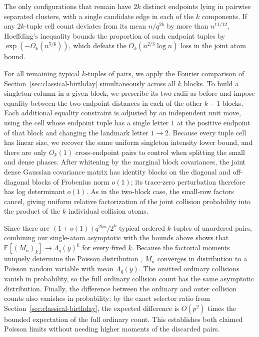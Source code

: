 The only configurations that remain have \(2k\) distinct endpoints lying in pairwise separated clusters, with a single candidate edge in each of the \(k\) components. If any \(2k\)-tuple cell count deviates from its mean \(n/q^{2k}\) by more than \(n^{11/12}\), Hoeffding's inequality bounds the proportion of such endpoint tuples by \(\exp(-\Omega_k(n^{5/6}))\), which defeats the \(O_k(n^{2/3}\log n)\) loss in the joint atom bound.

For all remaining typical \(k\)-tuples of pairs, we apply the Fourier comparison of Section~\ref{sec:classical-birthday} simultaneously across all \(k\) blocks. To build a singleton column in a given block, we prescribe its two radii as before and impose equality between the two endpoint distances in each of the other \(k-1\) blocks. Each additional equality constraint is adjusted by an independent unit move, using the cell whose endpoint tuple has a single letter \(1\) at the positive endpoint of that block and changing the landmark letter \(1\to2\). Because every tuple cell has linear size, we recover the same uniform singleton intensity lower bound, and there are only \(O_k(1)\) cross-endpoint pairs to control when splitting the small and dense phases. After whitening by the marginal block covariances, the joint dense Gaussian covariance matrix has identity blocks on the diagonal and off-diagonal blocks of Frobenius norm \(o(1)\); its trace-zero perturbation therefore has log determinant \(o(1)\). As in the two-block case, the small-row factors cancel, giving uniform relative factorization of the joint collision probability into the product of the \(k\) individual collision atoms.

Since there are \((1+o(1))q^{2kn}/2^k\) typical ordered \(k\)-tuples of unordered pairs, combining our single-atom asymptotic with the bounds above shows that \(\mathbb E[(M_n)_k]\to\Lambda_q(y)^k\) for every fixed \(k\). Because the factorial moments uniquely determine the Poisson distribution \cite{JLR}, \(M_n\) converges in distribution to a Poisson random variable with mean \(\Lambda_q(y)\). The omitted ordinary collisions vanish in probability, so the full ordinary collision count has the same asymptotic distribution. Finally, the difference between the ordinary and outer collision counts also vanishes in probability: by the exact selector ratio from Section~\ref{sec:classical-birthday}, the expected difference is \(O(p^2)\) times the bounded expectation of the full ordinary count. This establishes both claimed Poisson limits without needing higher moments of the discarded pairs.
